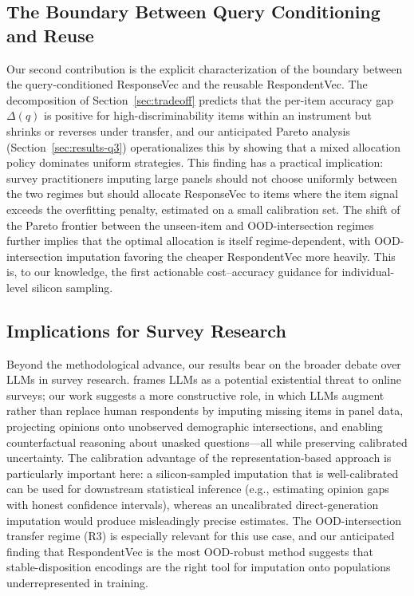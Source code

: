\subsection{The Boundary Between Query Conditioning and Reuse}
Our second contribution is the explicit characterization of the boundary between the query-conditioned ResponseVec and the reusable RespondentVec. The decomposition of Section~\ref{sec:tradeoff} predicts that the per-item accuracy gap $\Delta(q)$ is positive for high-discriminability items within an instrument but shrinks or reverses under transfer, and our anticipated Pareto analysis (Section~\ref{sec:results-q3}) operationalizes this by showing that a mixed allocation policy dominates uniform strategies. This finding has a practical implication: survey practitioners imputing large panels should not choose uniformly between the two regimes but should allocate ResponseVec to items where the item signal exceeds the overfitting penalty, estimated on a small calibration set. The shift of the Pareto frontier between the unseen-item and OOD-intersection regimes further implies that the optimal allocation is itself regime-dependent, with OOD-intersection imputation favoring the cheaper RespondentVec more heavily. This is, to our knowledge, the first actionable cost--accuracy guidance for individual-level silicon sampling.

\subsection{Implications for Survey Research}
Beyond the methodological advance, our results bear on the broader debate over LLMs in survey research. \citet{westwood2025potential} frames LLMs as a potential existential threat to online surveys; our work suggests a more constructive role, in which LLMs augment rather than replace human respondents by imputing missing items in panel data, projecting opinions onto unobserved demographic intersections, and enabling counterfactual reasoning about unasked questions---all while preserving calibrated uncertainty. The calibration advantage of the representation-based approach is particularly important here: a silicon-sampled imputation that is well-calibrated can be used for downstream statistical inference (e.g., estimating opinion gaps with honest confidence intervals), whereas an uncalibrated direct-generation imputation would produce misleadingly precise estimates. The OOD-intersection transfer regime (R3) is especially relevant for this use case, and our anticipated finding that RespondentVec is the most OOD-robust method suggests that stable-disposition encodings are the right tool for imputation onto populations underrepresented in training.

